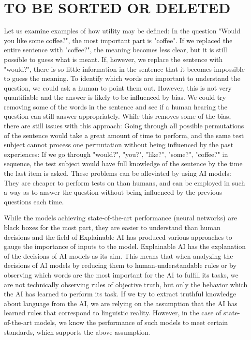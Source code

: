 \section{TO BE SORTED OR DELETED}
Let us examine examples of how utility may be defined:
In the question "Would you like some coffee?", the most important part is "coffee".
If we replaced the entire sentence with "coffee?", the meaning becomes less clear, but it is still possible to guess what is meant.
If, however, we replace the sentence with "would?", there is so little information in the sentence that it becomes impossible to guess the meaning.
To identify which words are important to understand the question, we could ask a human to point them out.
However, this is not very quantifiable and the answer is likely to be influenced by bias.
We could try removing some of the words in the sentence and see if a human hearing the question can still answer appropriately.
While this removes some of the bias, there are still issues with this approach:
Going through all possible permutations of the sentence would take a great amount of time to perform, and the same test subject cannot process one permutation without being influenced by the past experiences:
If we go through "would?", "you?", "like?", "some?", "coffee?" in sequence, the test subject would have full knowledge of the sentence by the time the last item is asked.
These problems can be alleviated by using AI models: They are cheaper to perform tests on than humans, and can be employed in such a way as to answer the question without being influenced by the previous questions each time.



While the models achieving state-of-the-art performance (neural networks) are black boxes for the most part, they are easier to understand than human decisions and the field of Explainable AI has produced various approaches to gauge the importance of inputs to the model.
Explainable AI has the explanation of the decisions of AI models as its aim.
This means that when analyzing the decisions of AI models by reducing them to human-understandable rules or by observing which words are the most important for the AI to fulfill its tasks, we are not technically observing rules of objective truth, but only the behavior which the AI has learned to perform its task.
If we try to extract truthful knowledge about language from the AI, we are relying on the assumption that the AI has learned rules that correspond to linguistic reality.
However, in the case of state-of-the-art models, we know the performance of such models to meet certain standards, which supports the above assumption.

